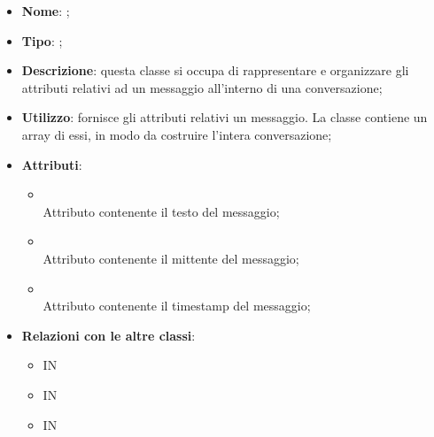 \begin{itemize}
	\item \textbf{Nome}: ;
	\item \textbf{Tipo}: ;
	\item \textbf{Descrizione}: questa classe si occupa di rappresentare e organizzare gli attributi relativi ad un messaggio all'interno di una conversazione;
	\item \textbf{Utilizzo}: fornisce gli attributi relativi un messaggio. La classe  contiene un array di essi, in modo da costruire l'intera conversazione;
	\item \textbf{Attributi}:
	\begin{itemize}
		\item[]  \\
		Attributo contenente il testo del messaggio;
		\item[]  \\
		Attributo contenente il mittente del messaggio;
		\item[]  \\
		Attributo contenente il timestamp del messaggio;
	\end{itemize}
	\item \textbf{Relazioni con le altre classi}:
	\begin{itemize}
		\item IN \hyperlink{Conversation_label}{}
		\item IN \hyperlink{<<interface>> ConversationsDAO_label}{}
		\item IN \hyperlink{ConversationsDAODynamoDB_label}{}
	\end{itemize}
\end{itemize}
\FloatBarrier

